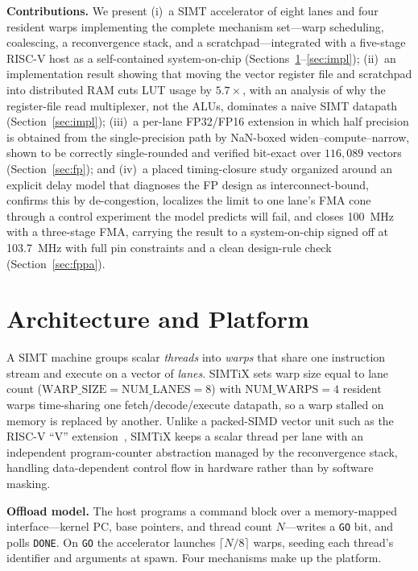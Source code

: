 \documentclass[10pt,conference]{IEEEtran}
\begin{document}
\noindent\textbf{Contributions.} We present (i)~a SIMT accelerator of eight lanes
and four resident warps implementing the complete mechanism set---warp scheduling,
coalescing, a reconvergence stack, and a scratchpad---integrated with a five-stage
RISC-V host as a self-contained system-on-chip
(Sections~\ref{sec:arch}--\ref{sec:impl}); (ii)~an implementation result showing
that moving the vector register file and scratchpad into distributed RAM cuts LUT
usage by $5.7\times$, with an analysis of why the register-file read multiplexer,
not the ALUs, dominates a naive SIMT datapath (Section~\ref{sec:impl});
(iii)~a per-lane FP32/FP16 extension in which half precision is obtained from the
single-precision path by NaN-boxed widen--compute--narrow, shown to be correctly
single-rounded and verified bit-exact over $116{,}089$ vectors
(Section~\ref{sec:fp}); and (iv)~a placed timing-closure study organized around an
explicit delay model that diagnoses the FP design as interconnect-bound, confirms
this by de-congestion, localizes the limit to one lane's FMA cone through a
control experiment the model predicts will fail, and closes 100~MHz with a
three-stage FMA, carrying the result to a system-on-chip signed off at 103.7~MHz
with full pin constraints and a clean design-rule check (Section~\ref{sec:fppa}).

\section{Architecture and Platform}\label{sec:arch}
A SIMT machine groups scalar \emph{threads} into \emph{warps} that share one
instruction stream and execute on a vector of \emph{lanes}. SIMTiX sets warp size
equal to lane count ($\mathrm{WARP\_SIZE}=\mathrm{NUM\_LANES}=8$) with
$\mathrm{NUM\_WARPS}=4$ resident warps time-sharing one fetch/decode/execute
datapath, so a warp stalled on memory is replaced by another. Unlike a packed-SIMD
vector unit such as the RISC-V ``V'' extension~\cite{riscvvector}, SIMTiX keeps a
scalar thread per lane with an independent program-counter abstraction managed by
the reconvergence stack, handling data-dependent control flow in hardware rather
than by software masking.

\textbf{Offload model.} The host programs a command block over a memory-mapped
interface---kernel PC, base pointers, and thread count $N$---writes a \texttt{GO}
bit, and polls \texttt{DONE}. On \texttt{GO} the accelerator launches
$\lceil N/8\rceil$ warps, seeding each thread's identifier and arguments at spawn.
Four mechanisms make up the platform.
\end{document}
